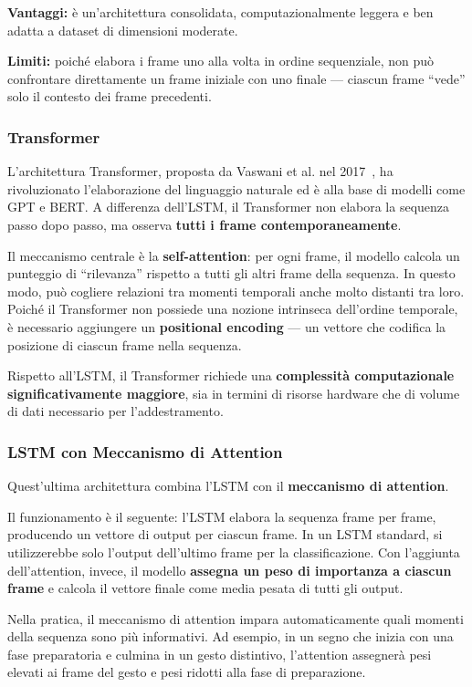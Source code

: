 \textbf{Vantaggi:} è un'architettura consolidata, computazionalmente leggera e ben adatta a dataset di dimensioni moderate.

\textbf{Limiti:} poiché elabora i frame uno alla volta in ordine sequenziale, non può confrontare direttamente un frame iniziale con uno finale --- ciascun frame ``vede'' solo il contesto dei frame precedenti.

\subsubsection{Transformer}

L'architettura Transformer, proposta da Vaswani et al. nel 2017~\cite{vaswani2017attention}, ha rivoluzionato l'elaborazione del linguaggio naturale ed è alla base di modelli come GPT e BERT. A differenza dell'LSTM, il Transformer non elabora la sequenza passo dopo passo, ma osserva \textbf{tutti i frame contemporaneamente}.

Il meccanismo centrale è la \textbf{self-attention}: per ogni frame, il modello calcola un punteggio di ``rilevanza'' rispetto a tutti gli altri frame della sequenza. In questo modo, può cogliere relazioni tra momenti temporali anche molto distanti tra loro. Poiché il Transformer non possiede una nozione intrinseca dell'ordine temporale, è necessario aggiungere un \textbf{positional encoding} --- un vettore che codifica la posizione di ciascun frame nella sequenza.

Rispetto all'LSTM, il Transformer richiede una \textbf{complessità computazionale significativamente maggiore}, sia in termini di risorse hardware che di volume di dati necessario per l'addestramento.


\subsubsection{LSTM con Meccanismo di Attention}

Quest'ultima architettura combina l'LSTM con il \textbf{meccanismo di attention}.

Il funzionamento è il seguente: l'LSTM elabora la sequenza frame per frame, producendo un vettore di output per ciascun frame. In un LSTM standard, si utilizzerebbe solo l'output dell'ultimo frame per la classificazione. Con l'aggiunta dell'attention, invece, il modello \textbf{assegna un peso di importanza a ciascun frame} e calcola il vettore finale come media pesata di tutti gli output.

Nella pratica, il meccanismo di attention impara automaticamente quali momenti della sequenza sono più informativi. Ad esempio, in un segno che inizia con una fase preparatoria e culmina in un gesto distintivo, l'attention assegnerà pesi elevati ai frame del gesto e pesi ridotti alla fase di preparazione.

